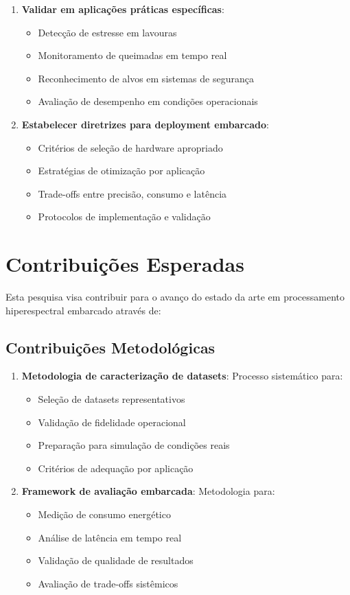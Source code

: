 \begin{enumerate}
    \item \textbf{Validar em aplicações práticas específicas}:
    \begin{itemize}
        \item Detecção de estresse em lavouras
        \item Monitoramento de queimadas em tempo real
        \item Reconhecimento de alvos em sistemas de segurança
        \item Avaliação de desempenho em condições operacionais
    \end{itemize}
    
    \item \textbf{Estabelecer diretrizes para deployment embarcado}:
    \begin{itemize}
        \item Critérios de seleção de hardware apropriado
        \item Estratégias de otimização por aplicação
        \item Trade-offs entre precisão, consumo e latência
        \item Protocolos de implementação e validação
    \end{itemize}
\end{enumerate}

\section{Contribuições Esperadas}\label{sec:contribuicoes}

Esta pesquisa visa contribuir para o avanço do estado da arte em processamento hiperespectral embarcado através de:

\subsection{Contribuições Metodológicas}
\begin{enumerate}
    \item \textbf{Metodologia de caracterização de datasets}: Processo sistemático para:
    \begin{itemize}
        \item Seleção de datasets representativos
        \item Validação de fidelidade operacional
        \item Preparação para simulação de condições reais
        \item Critérios de adequação por aplicação
    \end{itemize}
    
    \item \textbf{Framework de avaliação embarcada}: Metodologia para:
    \begin{itemize}
        \item Medição de consumo energético
        \item Análise de latência em tempo real
        \item Validação de qualidade de resultados
        \item Avaliação de trade-offs sistêmicos
    \end{itemize}
\end{enumerate}

